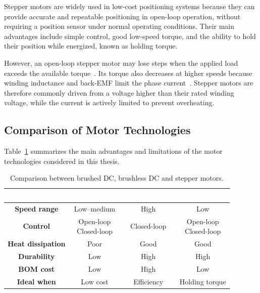 Stepper motors are widely used in low-cost positioning systems because they can provide accurate and repeatable positioning in open-loop operation, without requiring a position sensor under normal operating conditions. Their main advantages include simple control, good low-speed torque, and the ability to hold their position while energized, known as holding torque.

However, an open-loop stepper motor may lose steps when the applied load exceeds the available torque~\cite{faulhaber_step_loss_tutorial}. Its torque also decreases at higher speeds because winding inductance and back-EMF limit the phase current~\cite{faulhaber_stepper_basics}. Stepper motors are therefore commonly driven from a voltage higher than their rated winding voltage, while the current is actively limited to prevent overheating.

\subsection{Comparison of Motor Technologies}
\label{sec:comparison-motor-technologies}

Table~\ref{tab:motor-technology-comparison} summarizes the main advantages and limitations of the motor technologies considered in this thesis.

\begin{table}[H]
    \centering
    \renewcommand{\arraystretch}{1.25}
    \setlength{\tabcolsep}{10pt}
    \begin{tabular}{>{\bfseries}c c c c}
        \rowcolor{thesisblue}
        \textcolor{white}{\textbf{Characteristic}} &
        \textcolor{white}{\textbf{Brushed DC}} &
        \textcolor{white}{\textbf{Brushless DC}} &
        \textcolor{white}{\textbf{Stepper}} \\
        \hline
        \rowcolor{thesislightgray}
        Speed range      & Low--medium   & High             & Low              \\
        Control & \makecell{Open-loop\\Closed-loop} & Closed-loop & \makecell{Open-loop\\Closed-loop} \\        \rowcolor{thesislightgray}
        Heat dissipation & Poor          & Good             & Good             \\
        Durability       & Low           & High             & High             \\
        \rowcolor{thesislightgray}
        BOM cost         & Low           & High             & Low              \\
        Ideal when       & Low cost      & Efficiency       & Holding torque   \\
        \hline
    \end{tabular}
    \caption{Comparison between brushed DC, brushless DC and stepper motors.}
    \label{tab:motor-technology-comparison}
\end{table}

